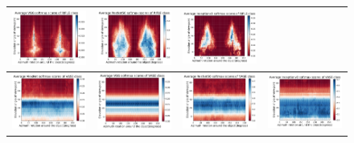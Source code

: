 \begin{figure}[h]
\begin{tabular}{||c|c|c|c||}
\includegraphics[width = 4cm]{supimages/nms2d/VGG_rifle_Average.pdf}&
\includegraphics[width = 4cm]{supimages/nms2d/ResNet50_rifle_Average.pdf}&
\includegraphics[width = 4cm]{supimages/nms2d/Inceptionv3_rifle_Average.pdf}\\ \hline
\includegraphics[width = 4cm]{supimages/nms2d/AlexNet_vase_Average.pdf}&
\includegraphics[width = 4cm]{supimages/nms2d/VGG_vase_Average.pdf}&
\includegraphics[width = 4cm]{supimages/nms2d/ResNet50_vase_Average.pdf}&
\includegraphics[width = 4cm]{supimages/nms2d/Inceptionv3_vase_Average.pdf}\\ \hline

\end{tabular}
\end{figure}

